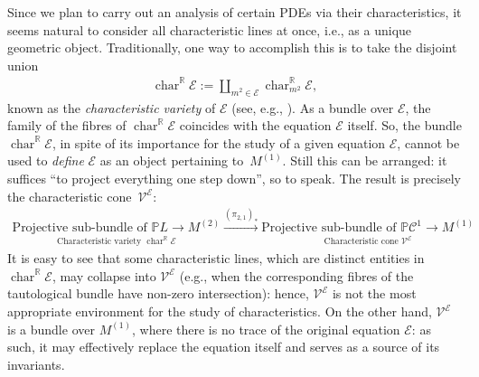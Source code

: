 \documentclass[10pt,a4paper]{amsart}
\newcommand{\R}{\mathbb{R}}
\newcommand{\C}{\mathcal{C}}
\newcommand{\M}{\mathcal{V}}
\newcommand{\E}{\mathcal{E}}
\newcommand{\V}{{\mathcal{V}}}
\renewcommand{\P}{\mathbb{P}}
\newcommand{\Char}[1]{\operatorname{char}^\R_{#1}}
\numberwithin{equation}{section}
\begin{document}
Since we plan to carry out an analysis of certain PDEs via their characteristics, it seems na\-tural to consider all characteristic lines at once, i.e., as a unique geometric object. Traditionally, one way to accomplish this is to take the disjoint union
\begin{gather*}
\Char{}{\E}:=\coprod_{m^2\in\E}\Char{m^2}{\E},%
\end{gather*}
 known as the \emph{characteristic variety} of $\E$ (see, e.g., \cite{MR1083148}). As a bundle over $\E$, the family of the f\/ibres of $\Char{}{\E}$ coincides with the equation $\E$ itself. So, the bundle $\Char{}{\E}$, in spite of its importance for the study of a given equation $\E$, cannot be used to \emph{define} $\E$ as an object pertaining to~$M^{(1)}$. Still this can be arranged: it suf\/f\/ices ``to project everything one step down'', so to speak. The result is precisely the characteristic cone~$\V^\E$:
 \begin{gather}\label{eq.char.cone.2}
\underset{\textrm{Characteristic variety }\Char{}{\E}}{\boxed{\textrm{Projective sub-bundle of }\P L\to M^{(2)}}}\stackrel{(\pi_{2,1})_\ast}{\longrightarrow}\underset{\textrm{Characteristic cone }\M^{\E}}{\boxed{\textrm{Projective sub-bundle of }\P \C^1\to M^{(1)}}}\!\!\!
\end{gather}
It is easy to see that some characteristic lines, which are distinct entities in $\Char{}{\E}$, may collapse into $\M^{\E}$ (e.g., when the corresponding f\/ibres of the tautological bundle have non-zero intersection): hence, $\M^{\E}$ is not the most appropriate environment for the study of characteristics. On the other hand, $\M^{\E}$ is a bundle over $ M^{(1)}$, where there is no trace of the original equation $\E$: as such, it may ef\/fectively replace the equation itself and serves as a source of its invariants.
\end{document}
